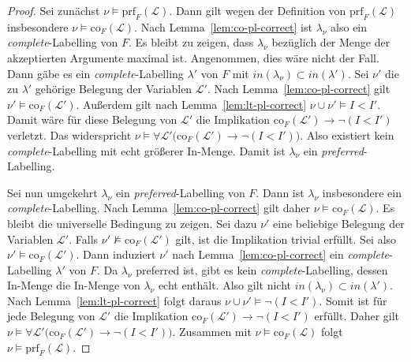 \begin{proof}
    \label{pr:prf-pl-correct}
    Sei zunächst
    \(\nu \models \mathrm{prf}_F(\mathcal{L})\). Dann gilt wegen der
    Definition von \(\mathrm{prf}_F(\mathcal{L})\) insbesondere
    \(\nu \models \mathrm{co}_F(\mathcal{L}).\)
    Nach Lemma~\ref{lem:co-pl-correct} ist \(\lambda_\nu\) also ein
    \textit{complete}-Labelling von \(F\).
    Es bleibt zu zeigen, dass \(\lambda_\nu\) bezüglich der Menge der
    akzeptierten Argumente maximal ist. Angenommen, dies wäre nicht der Fall.
    Dann gäbe es ein \textit{complete}-Labelling \(\lambda'\) von \(F\) mit
    \(\mathit{in}(\lambda_\nu) \subset \mathit{in}(\lambda').\)
    Sei \(\nu'\) die zu \(\lambda'\) gehörige Belegung der Variablen
    \(\mathcal{L}'\). 
    Nach Lemma~\ref{lem:co-pl-correct} gilt
    \( \nu' \models \mathrm{co}_F(\mathcal{L}').\)
    Außerdem gilt nach Lemma~\ref{lem:lt-pl-correct}
    \( \nu \cup \nu' \models I < I'.\)
    Damit wäre für diese Belegung von \(\mathcal{L}'\) die Implikation
    \( \mathrm{co}_F(\mathcal{L}') \rightarrow \neg(I<I')\)
    verletzt. Das widerspricht
    \( \nu \models
        \forall \mathcal{L}'
        \bigl(
            \mathrm{co}_F(\mathcal{L}') \rightarrow \neg(I<I')
        \bigr).\)
    Also existiert kein \textit{complete}-Labelling mit echt größerer
    In-Menge. Damit ist \(\lambda_\nu\) ein \textit{preferred}-Labelling.

    Sei nun umgekehrt \(\lambda_\nu\) ein
    \textit{preferred}-Labelling von \(F\). Dann ist \(\lambda_\nu\)
    insbesondere ein \textit{complete}-Labelling. Nach
    Lemma~\ref{lem:co-pl-correct} gilt daher
    \( \nu \models \mathrm{co}_F(\mathcal{L}).\)
    Es bleibt die universelle Bedingung zu zeigen. Sei dazu \(\nu'\) eine
    beliebige Belegung der Variablen \(\mathcal{L}'\). Falls
    \( \nu' \not\models \mathrm{co}_F(\mathcal{L}')\)
    gilt, ist die Implikation trivial erfüllt. Sei also
    \( \nu' \models \mathrm{co}_F(\mathcal{L}').\)
    Dann induziert \(\nu'\) nach Lemma~\ref{lem:co-pl-correct} ein
    \textit{complete}-Labelling \(\lambda'\) von \(F\).
    Da \(\lambda_\nu\) preferred ist, gibt es kein \textit{complete}-Labelling,
    dessen In-Menge die In-Menge von \(\lambda_\nu\) echt enthält. Also gilt
    nicht \( \mathit{in}(\lambda_\nu) \subset \mathit{in}(\lambda').\)
    Nach Lemma~\ref{lem:lt-pl-correct} folgt daraus
    \( \nu\cup\nu' \models \neg(I<I').\)
    Somit ist für jede Belegung von \(\mathcal{L}'\) die Implikation
    \(\mathrm{co}_F(\mathcal{L}') \rightarrow \neg(I<I')\)
    erfüllt. Daher gilt
    \(
        \nu \models
        \forall \mathcal{L}'
        \bigl(
            \mathrm{co}_F(\mathcal{L}') \rightarrow \neg(I<I')
        \bigr).
    \)
    Zusammen mit
    \(\nu\models \mathrm{co}_F(\mathcal{L})\) folgt
    \( \nu \models \mathrm{prf}_F(\mathcal{L}).\)
\end{proof}


